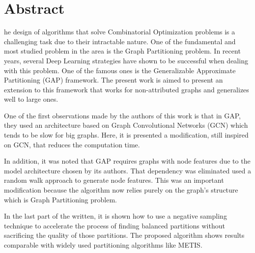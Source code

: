 

\chapter*{Abstract}

he design of algorithms that solve Combinatorial Optimization problems is a challenging task due to their intractable nature. One of the fundamental and most studied problem in the area is the Graph Partitioning problem. In recent years, several Deep Learning strategies have shown to be successful when dealing with this problem. One of the famous ones is the Generalizable Approximate Partitioning (GAP) framework. The present work is aimed to present an extension to this framework that works for non-attributed graphs and generalizes well to large ones.

One of the first observations made by the authors of this work is that in GAP, they used an architecture based on Graph Convolutional Networks (GCN) which tends to be slow for big graphs. Here, it is presented a modification, still inspired on GCN, that reduces the computation time.

In addition, it was noted that GAP requires graphs with node features due to the model architecture chosen by its authors. That dependency was eliminated used a random walk approach to generate node features. This was an important modification because the algorithm now relies purely on the graph's structure which is Graph Partitioning problem.

In the last part of the written, it is shown how to use a negative sampling technique to accelerate the process of finding balanced partitions without sacrificing the quality of those partitions. The proposed algorithm shows results comparable with widely used partitioning algorithms like METIS.


\clearpage